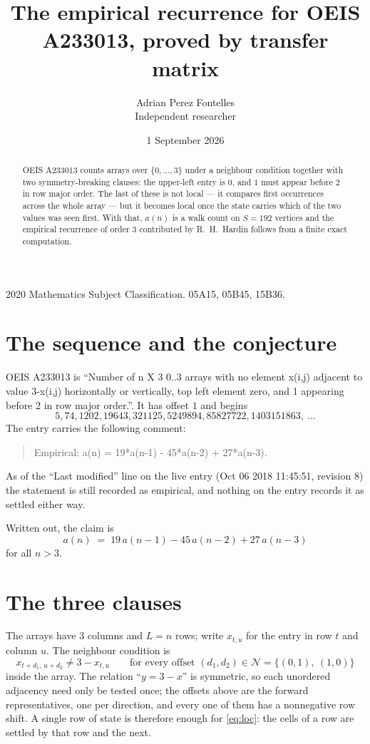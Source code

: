 \documentclass[11pt,a4paper]{article}
\title{The empirical recurrence for OEIS A233013, proved by transfer matrix}
\author{Adrian Perez Fontelles\\ \small Independent researcher}
\date{1 September 2026}
\theoremstyle{plain}
\theoremstyle{definition}
\begin{document}
\maketitle

\begin{abstract}
OEIS A233013 counts arrays over $\{0,\dots,3\}$ under a neighbour condition together with
two symmetry-breaking clauses: the upper-left entry is $0$, and $1$ must appear before
$2$ in row major order. The last of these is not local --- it compares first occurrences
across the whole array --- but it becomes local once the state carries which of the two values
was seen first. With that, $a(n)$ is a walk count on $S=192$ vertices and the empirical
recurrence of order $3$ contributed by R.~H.~Hardin follows from a finite exact
computation.
\end{abstract}

\noindent\small 2020 Mathematics Subject Classification. 05A15, 05B45, 15B36.\normalsize

\section{The sequence and the conjecture}

OEIS A233013 is ``Number of n X 3 0..3 arrays with no element x(i,j) adjacent to value 3-x(i,j) horizontally or vertically, top left element zero, and 1 appearing before 2 in row major order.''. It has offset $1$ and begins
\[
5, 74, 1202, 19643, 321125, 5249894, 85827722, 1403151863,\ \dots
\]
The entry carries the following comment:
\begin{quote}\small
Empirical: a(n) = 19*a(n-1) - 45*a(n-2) + 27*a(n-3).
\end{quote}
As of the ``Last modified'' line on the live entry (Oct 06 2018 11:45:51, revision 8) the statement is
still recorded as empirical, and nothing on the entry records it as settled either way.

Written out, the claim is
\begin{equation}\label{eq:conj}
a(n)\;=\;19\,a(n-1) - 45\,a(n-2) + 27\,a(n-3)
\end{equation}
for all $n>3$.

\section{The three clauses}

The arrays have $3$ columns and $L=n$ rows; write $x_{t,u}$ for the entry in
row $t$ and column $u$. The neighbour condition is
\begin{equation}\label{eq:loc}
x_{t+d_1,\,u+d_2}\ne 3-x_{t,u}\qquad\text{for every offset }(d_1,d_2)\in\mathcal N=\{(0,1),\ (1,0)\}
\end{equation}
inside the array. The relation ``$y=3-x$'' is symmetric, so each unordered adjacency need
only be tested once; the offsets above are the forward representatives, one per direction,
and every one of them has a nonnegative row shift. A single row of state is therefore
enough for \eqref{eq:loc}: the cells of a row are settled by that row and the next.
\end{document}

